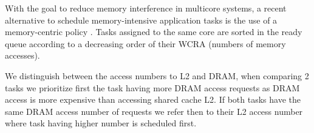 

With the goal to reduce memory interference in multicore systems, a recent alternative to schedule memory-intensive application tasks is the use of a memory-centric policy \cite{Yao2015,Yao2012}. Tasks assigned to the same core are sorted in the ready queue according to a decreasing order of their WCRA (numbers of memory accesses). 

We distinguish between the access numbers to L2 and DRAM, when comparing 2 tasks we prioritize first the task having more DRAM access requests as DRAM access is more expensive than accessing shared cache L2. If both tasks have the same DRAM access number of requests we refer then to their L2 access number where task having higher number is scheduled first.


 